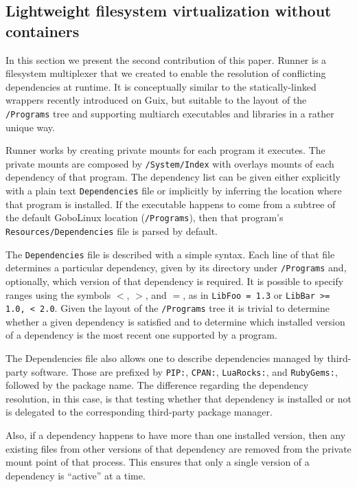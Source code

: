 \documentclass[sigplan, anonymous, 10pt]{acmart}
\begin{document}
\subsection{Lightweight filesystem virtualization without containers}
In this section we present the second contribution of this paper. Runner is a
filesystem multiplexer that we created to enable the resolution of conflicting
dependencies at runtime. It is conceptually similar to the statically-linked
wrappers recently introduced on Guix, but suitable to the layout of the
\texttt{/Programs} tree and supporting multiarch executables and libraries
in a rather unique way.

Runner works by creating private mounts for each program it executes. The
private mounts are composed by \texttt{/System/Index} with overlays mounts
of each dependency of that program. The dependency list can be given either
explicitly with a plain text \texttt{Dependencies} file or implicitly by
inferring the location where that program is installed. If the executable
happens to come from a subtree of  the default GoboLinux location
(\texttt{/Programs}), then that program's \texttt{Resources/Dependencies}
file is parsed by default.

The \texttt{Dependencies} file is described with a simple syntax. Each line of that file determines
a particular dependency, given by its directory under \texttt{/Programs} and, optionally,
which version of that dependency is required. It is possible to specify ranges using the
symbols $<$, $>$, and $=$, as in \texttt{LibFoo = 1.3} or \texttt{LibBar >= 1.0, < 2.0}.
Given the layout of the \texttt{/Programs} tree it is trivial to determine whether a given
dependency is satisfied and to determine which installed version of a dependency is the most
recent one supported by a program.

The Dependencies file also allows one to describe dependencies managed by third-party
software. Those are prefixed by \texttt{PIP:}, \texttt{CPAN:}, \texttt{LuaRocks:}, and
\texttt{RubyGems:}, followed by the package name. The difference regarding the dependency
resolution, in this case, is that testing whether that dependency is installed or not is
delegated to the corresponding third-party package manager.

Also, if a dependency happens to have more than
one installed version, then any existing files from other versions of that
dependency are removed from the private mount point of that process. This
ensures that only a single version of a dependency is ``active'' at a time.
\end{document}
